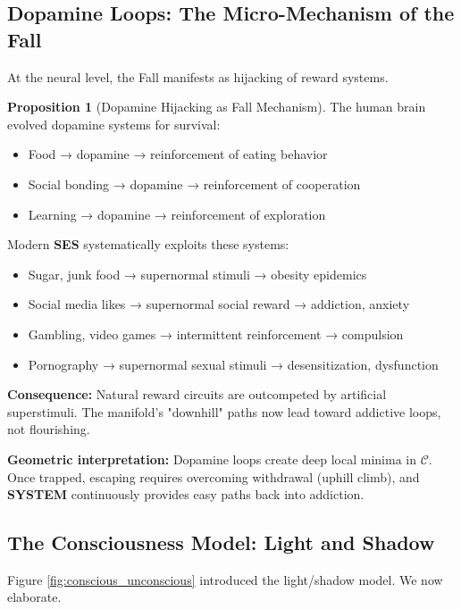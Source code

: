 \documentclass[11pt,a4paper]{article}
\newcommand{\SYSTEM}{\textbf{SYSTEM}}
\newcommand{\SES}{\textbf{SES}}
\newcommand{\CC}{$\mathcal{C}$}
\theoremstyle{definition}
\newtheorem{proposition}{Proposition}[section]
\theoremstyle{remark}
\begin{document}
\subsection{Dopamine Loops: The Micro-Mechanism of the Fall}

At the neural level, the Fall manifests as hijacking of reward systems.

\begin{proposition}[Dopamine Hijacking as Fall Mechanism]
\label{prop:dopamine}
The human brain evolved dopamine systems for survival:
\begin{itemize}
\item Food → dopamine → reinforcement of eating behavior
\item Social bonding → dopamine → reinforcement of cooperation
\item Learning → dopamine → reinforcement of exploration
\end{itemize}

Modern \SES{} systematically exploits these systems:
\begin{itemize}
\item Sugar, junk food → supernormal stimuli → obesity epidemics
\item Social media likes → supernormal social reward → addiction, anxiety
\item Gambling, video games → intermittent reinforcement → compulsion
\item Pornography → supernormal sexual stimuli → desensitization, dysfunction
\end{itemize}

\textbf{Consequence:} Natural reward circuits are outcompeted by artificial superstimuli. The manifold's "downhill" paths now lead toward addictive loops, not flourishing.

\textbf{Geometric interpretation:} Dopamine loops create deep local minima in \CC{}. Once trapped, escaping requires overcoming withdrawal (uphill climb), and \SYSTEM{} continuously provides easy paths back into addiction.
\end{proposition}

\subsection{The Consciousness Model: Light and Shadow}

Figure \ref{fig:conscious_unconscious} introduced the light/shadow model. We now elaborate.
\end{document}
